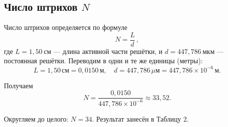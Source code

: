 \subsection{Число штрихов \(N\)}

Число штрихов определяется по формуле
\[
	N = \frac{L}{d}\,,
\]
где \(L = 1{,}50\ \text{см}\) — длина активной части решётки,
и \(d = 447{,}786\ \text{мкм}\) — постоянная решётки.
Переводим в одни и те же единицы (метры):
\[
	L = 1{,}50\,\text{см} = 0{,}0150\,\text{м},
	\quad
	d = 447{,}786\,\mu\text{м} = 447{,}786 \times 10^{-6}\,\text{м}.
\]

Получаем
\[
	N = \frac{0{,}0150}{447{,}786\times10^{-6}}
	\approx 33{,}52.
\]

Округляем до целого: \(N = 34\).
Результат занесён в Таблицу 2.

